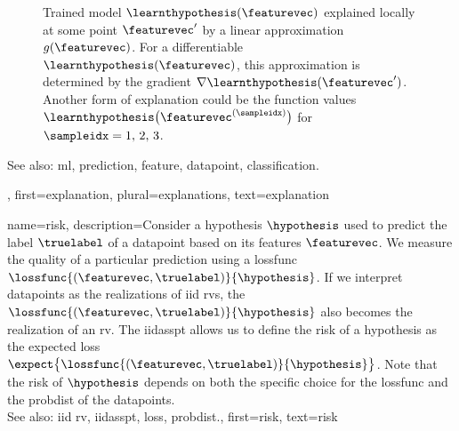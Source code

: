 {{\begin{figure}[H]
\begin{center}
	 	\end{center}
	 	\caption{Trained \gls{model} $\learnthypothesis(\featurevec)$ explained 
	     		locally at some point $\featurevec'$ by a linear approximation $g(\featurevec)$. 
	     		For a \gls{differentiable} $\learnthypothesis(\featurevec)$, this approximation is 
	     		determined by the \gls{gradient} $\nabla \learnthypothesis(\featurevec')$. Another 
	     		form of explanation could be the \gls{function} values $\learnthypothesis\big(\featurevec^{(\sampleidx)} \big)$ 
	     		for $\sampleidx=1, \,2, \,3$. 
			\label{fig_explanation_dict}}
	 	\end{figure} 
		See also: \gls{ml}, \gls{prediction}, \gls{feature}, \gls{datapoint}, \gls{classification}.},
	first={explanation},
	plural={explanations},
	text={explanation} 
}

{name={risk},
	description={Consider a \gls{hypothesis} $\hypothesis$ used to predict the \gls{label} 
		$\truelabel$ of a \gls{datapoint} based on its \glspl{feature} $\featurevec$. We measure 
		the quality of a particular \gls{prediction} using a \gls{lossfunc} $\lossfunc{(\featurevec,\truelabel)}{\hypothesis}$. 
		If we interpret \glspl{datapoint} as the \glspl{realization} of \gls{iid} \glspl{rv}, 
		the $\lossfunc{(\featurevec,\truelabel)}{\hypothesis}$ also becomes the \gls{realization} 
		of an \gls{rv}. The \gls{iidasspt} allows us to define the risk of a \gls{hypothesis} 
		as the expected \gls{loss} $\expect \big\{\lossfunc{(\featurevec,\truelabel)}{\hypothesis} \big\}$. 
		Note that the risk of $\hypothesis$ depends on both the specific choice for the \gls{lossfunc} and the 
		\gls{probdist} of the \glspl{datapoint}.
					\\ 
		See also: \gls{iid} \gls{rv}, \gls{iidasspt}, \gls{loss}, \gls{probdist}.},
	first={risk},
	text={risk} 
}

